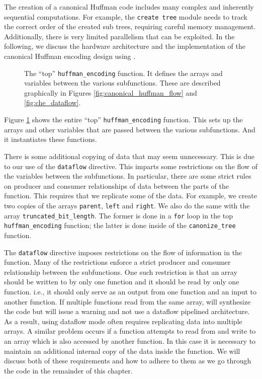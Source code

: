 The creation of a canonical Huffman code includes many complex and inherently sequential computations. For example, the \lstinline{create tree} module needs to track the correct order of the created sub trees, requiring careful memory management. Additionally, there is very limited parallelism that can be exploited. In the following, we discuss the hardware architecture and the implementation of the canonical Huffman encoding design using \VHLS. 

\begin{figure}

\end{figure}
\begin{figure}

\caption{  The ``top'' \lstinline{huffman_encoding} function. It defines the arrays and variables  between the various subfunctions.  These are described graphically in Figures \ref{fig:canonical_huffman_flow} and \ref{fig:che_dataflow}.  }
\label{fig:huffman_encoding.cpp}
\end{figure}

Figure \ref{fig:huffman_encoding.cpp} shows the entire ``top'' \lstinline{huffman_encoding} function. This sets up the arrays and other variables that are passed between the various subfunctions. And it instantiates these functions. 

There is some additional copying of data that may seem unnecessary. This is due to our use of the \lstinline{dataflow} directive. This imparts some restrictions on the flow of the variables between the subfunctions. In particular, there are some strict rules on producer and consumer relationships of data between the parts of the function. This requires that we replicate some of the data. For example, we create two copies of the arrays \lstinline{parent}, \lstinline{left} and \lstinline{right}. We also do the same with the array \lstinline{truncated_bit_length}. The former is done in a \lstinline{for} loop in the top \lstinline{huffman_encoding} function; the latter is done inside of the \lstinline{canonize_tree} function.

\begin{aside}
The \lstinline{dataflow} directive imposes restrictions on the flow of information in the function. Many of the restrictions enforce a strict producer and consumer relationship between the subfunctions.  One such restriction is that an array should be written to by only one function and it should be read by only one function. i.e., it should only serve as an output from one function and an input to another function. If multiple functions read from the same array, \VHLS will synthesize the code but will issue a warning and not use a dataflow pipelined architecture.  As a result, using dataflow mode often requires replicating data into multiple arrays. A similar problem occurs if a function attempts to read from and write to an array which is also accessed by another function.  In this case it is necessary to maintain an additional internal copy of the data inside the function.  We will discuss both of these requirements and how to adhere to them as we go through the code in the remainder of this chapter.
\end{aside}

